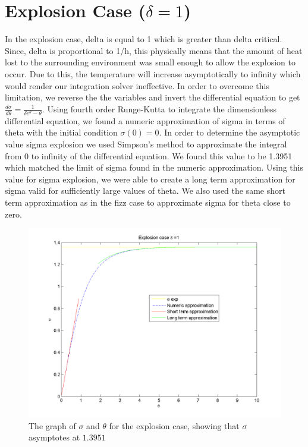 \documentclass{article}
\begin{document}
\section*{Explosion Case ($\delta=1$)}
In the explosion case, delta is equal to 1 which is greater than delta critical. Since, delta is proportional to 1/h, this physically means that the amount of heat lost to the surrounding environment was small enough to allow the explosion to occur. Due to this, the temperature will increase asymptotically to infinity which would render our integration solver ineffective. In order to overcome this limitation, we reverse the the variables and invert the differential equation to get
$\frac{d\sigma}{d\theta}=\frac{1}{\delta e^{\theta}-\theta}$. Using fourth order Runge-Kutta to integrate the dimensionless differential equation, we found a numeric approximation of sigma in terms of theta with the initial condition $\sigma (0) = 0$. In order to determine the asymptotic value sigma explosion we used Simpson's method to approximate the integral from 0 to infinity of the differential equation. We found this value to be 1.3951 which matched the limit of sigma found in the numeric approximation. Using this value for sigma explosion, we were able to create a long term approximation for sigma valid for sufficiently large values of theta. We also used the same short term approximation as in the fizz case to approximate sigma for theta close to zero. 
\begin{figure}[H]
    \centering
    \includegraphics[width=\textwidth]{explosion.png}
    \caption{The graph of $\sigma$ and $\theta$ for the explosion case, showing that $\sigma$ asymptotes at $1.3951$}
\end{figure}
\end{document}
